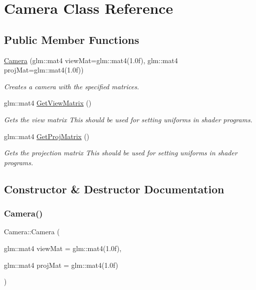 \hypertarget{class_camera}{}\section{Camera Class Reference}
\label{class_camera}
\subsection*{Public Member Functions}
\begin{DoxyCompactItemize}
\item 
\hyperlink{class_camera_aabf058eb164d6936a18ec4e9f550cb71}{Camera} (glm\+::mat4 view\+Mat=glm\+::mat4(1.\+0f), glm\+::mat4 proj\+Mat=glm\+::mat4(1.\+0f))
\begin{DoxyCompactList}\small\item\em Creates a camera with the specified matrices. \end{DoxyCompactList}\item 
glm\+::mat4 \hyperlink{class_camera_affa333055635aed96518c4c66be9a70c}{Get\+View\+Matrix} ()
\begin{DoxyCompactList}\small\item\em Gets the view matrix This should be used for setting uniforms in shader programs. \end{DoxyCompactList}\item 
glm\+::mat4 \hyperlink{class_camera_ad4af021f577c6326881c3596d76f99e9}{Get\+Proj\+Matrix} ()
\begin{DoxyCompactList}\small\item\em Gets the projection matrix This should be used for setting uniforms in shader programs. \end{DoxyCompactList}\end{DoxyCompactItemize}


\subsection{Constructor \& Destructor Documentation}
\mbox{\label{class_camera_aabf058eb164d6936a18ec4e9f550cb71}} 
\subsubsection{\texorpdfstring{Camera()}{Camera()}}
{\footnotesize\ttfamily Camera\+::\+Camera (\begin{DoxyParamCaption}\item[{glm\+::mat4}]{view\+Mat = {\ttfamily glm\+:\+:mat4(1.0f)},  }\item[{glm\+::mat4}]{proj\+Mat = {\ttfamily glm\+:\+:mat4(1.0f)} }\end{DoxyParamCaption})}



